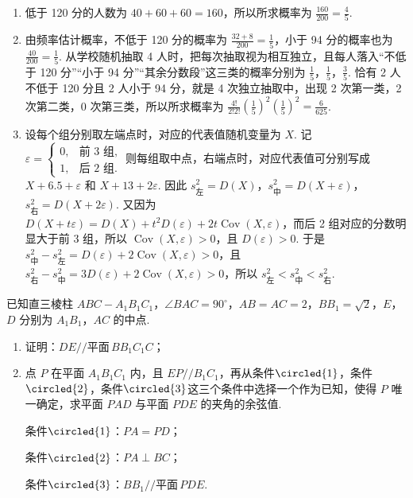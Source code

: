 \documentclass[UTF8,a4paper,oneside,11pt]{ctexbook}
\begin{document}
\begin{solution}
\begin{enumerate}
\item 低于 120 分的人数为 \( 40+60+60=160 \)，所以所求概率为 \( \frac{160}{200}=\frac{4}{5} \).

\item 由频率估计概率，不低于 120 分的概率为 \( \frac{32+8}{200}=\frac{1}{5} \)，小于 94 分的概率也为 \( \frac{40}{200}=\frac{1}{5} \).
从学校随机抽取 4 人时，把每次抽取视为相互独立，且每人落入“不低于 120 分”“小于 94 分”“其余分数段”这三类的概率分别为 \( \frac{1}{5} \)，\( \frac{1}{5} \)，\( \frac{3}{5} \).
恰有 2 人不低于 120 分且 2 人小于 94 分，就是 4 次独立抽取中，出现 2 次第一类，2 次第二类，0 次第三类，所以所求概率为 \( \frac{4!}{2!2!}\left( \frac{1}{5} \right)^2\left( \frac{1}{5} \right)^2=\frac{6}{625} \).

\item 设每个组分别取左端点时，对应的代表值随机变量为 \(X\). 记
\(
\varepsilon=
\begin{cases}
0, & \text{前 3 组},\\
1, & \text{后 2 组}.
\end{cases}
\)
则每组取中点，右端点时，对应代表值可分别写成 \( X+6.5+\varepsilon \) 和 \( X+13+2\varepsilon \).
因此 \( s_{\text{左}}^2=D\left( X \right) \)，\( s_{\text{中}}^2=D\left( X+\varepsilon \right) \)，\( s_{\text{右}}^2=D\left( X+2\varepsilon \right) \).
又因为 \( D\left( X+t\varepsilon \right)=D\left( X \right)+t^2D\left( \varepsilon \right)+2t\operatorname{Cov}\left( X,\varepsilon \right) \)，而后 2 组对应的分数明显大于前 3 组，所以 \( \operatorname{Cov}\left( X,\varepsilon \right)>0 \)，且 \( D\left( \varepsilon \right)>0 \). 于是 \( s_{\text{中}}^2-s_{\text{左}}^2=D\left( \varepsilon \right)+2\operatorname{Cov}\left( X,\varepsilon \right)>0 \)，且 \( s_{\text{右}}^2-s_{\text{中}}^2=3D\left( \varepsilon \right)+2\operatorname{Cov}\left( X,\varepsilon \right)>0 \)，所以 \( s_{\text{左}}^2<s_{\text{中}}^2<s_{\text{右}}^2 \).
\end{enumerate}
\end{solution}

\begin{problem}
已知直三棱柱 \( ABC-A_1B_1C_1 \)，\( \angle BAC=90^\circ \)，\( AB=AC=2 \)，\( BB_1=\sqrt{2} \)，\(E\)，\(D\) 分别为 \(A_1B_1\)，\(AC\) 的中点.

\begin{enumerate}
\item 证明：\( DE // \text{平面}\, BB_1C_1C \)；
\item 点 \(P\) 在平面 \(A_1B_1C_1\) 内，且 \( EP//B_1C_1 \)，再从条件\(\circled{1}\)，条件\(\circled{2}\)，条件\(\circled{3}\)这三个条件中选择一个作为已知，使得 \(P\) 唯一确定，求平面 \(PAD\) 与平面 \(PDE\) 的夹角的余弦值.

条件\(\circled{1}\)：\( PA=PD \)；

条件\(\circled{2}\)：\( PA\perp BC \)；

条件\(\circled{3}\)：\( BB_1 // \text{平面}\, PDE \).

\end{enumerate}

\end{problem}
\end{document}
